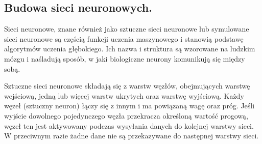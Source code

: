 \documentclass[a4paper,12pt,oneside]{book}
\def\nstyle{int(\lay<\Nnodlen?min(2,\lay):3)} %
\begin{document}
\subsection{Budowa sieci neuronowych.}
\begin{figure}[h!]
\centering
{}
\end{figure}

Sieci neuronowe, znane również jako sztuczne sieci neuronowe lub symulowane sieci neuronowe są częścią funkcji uczenia maszynowego i stanowią podstawę algorytmów uczenia głębokiego. Ich nazwa i struktura są wzorowane na ludzkim mózgu i naśladują sposób, w jaki biologiczne neurony komunikują się między sobą.

Sztuczne sieci neuronowe składają się z warstw węzłów, obejmujących warstwę wejściową, jedną lub więcej warstw ukrytych oraz warstwę wyjściową. Każdy węzeł (sztuczny neuron) łączy się z innym i ma powiązaną wagę oraz próg. Jeśli wyjście dowolnego pojedynczego węzła przekracza określoną wartość progową, węzeł ten jest aktywowany podczas wysyłania danych do kolejnej warstwy sieci. W przeciwnym razie żadne dane nie są przekazywane do następnej warstwy sieci.
\end{document}
